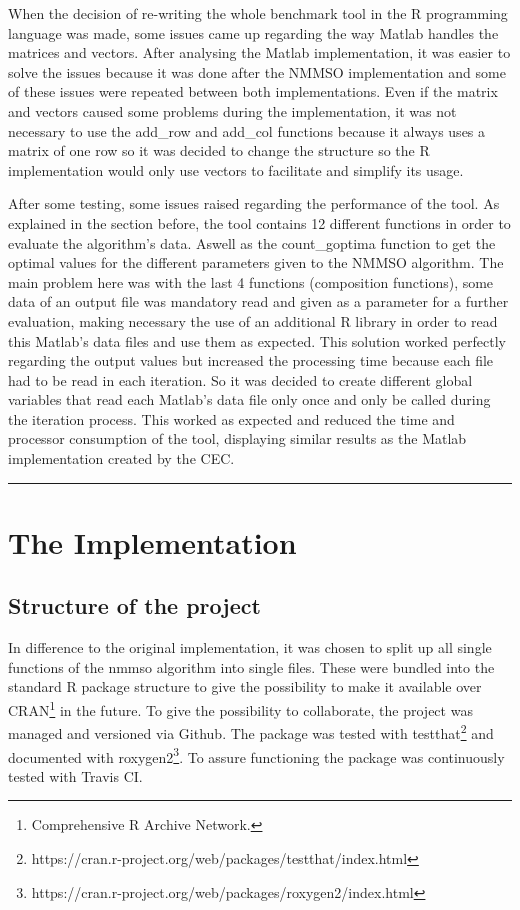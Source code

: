 \documentclass[12pt,a4paper]{article}
\begin{document}
When the decision of re-writing the whole benchmark tool in the R
programming language was made, some issues came up regarding the way
Matlab handles the matrices and vectors. After analysing the Matlab
implementation, it was easier to solve the issues because it was done
after the NMMSO implementation and some of these issues were repeated
between both implementations. Even if the matrix and vectors caused some
problems during the implementation, it was not necessary to use the
add\_row and add\_col functions because it always uses a matrix of one
row so it was decided to change the structure so the R implementation
would only use vectors to facilitate and simplify its usage.

After some testing, some issues raised regarding the performance of the
tool. As explained in the section before, the tool contains 12 different
functions in order to evaluate the algorithm's data. Aswell as the
count\_goptima function to get the optimal values for the different
parameters given to the NMMSO algorithm. The main problem here was with
the last 4 functions (composition functions), some data of an output
file was mandatory read and given as a parameter for a further
evaluation, making necessary the use of an additional R library in order
to read this Matlab's data files and use them as expected. This solution
worked perfectly regarding the output values but increased the
processing time because each file had to be read in each iteration. So
it was decided to create different global variables that read each
Matlab's data file only once and only be called during the iteration
process. This worked as expected and reduced the time and processor
consumption of the tool, displaying similar results as the Matlab
implementation created by the CEC.

\begin{center}\rule{0.5\linewidth}{\linethickness}\end{center}

\section{The Implementation}\label{the-implementation}

\subsection{Structure of the project}\label{structure-of-the-project}

In difference to the original implementation, it was chosen to split up
all single functions of the nmmso algorithm into single files. These
were bundled into the standard R package structure to give the
possibility to make it available over CRAN\footnote{Comprehensive R
  Archive Network.} in the future. To give the possibility to
collaborate, the project was managed and versioned via Github. The
package was tested with testthat\footnote{https://cran.r-project.org/web/packages/testthat/index.html}
and documented with roxygen2\footnote{https://cran.r-project.org/web/packages/roxygen2/index.html}.
To assure functioning the package was continuously tested with Travis
CI.
\end{document}
